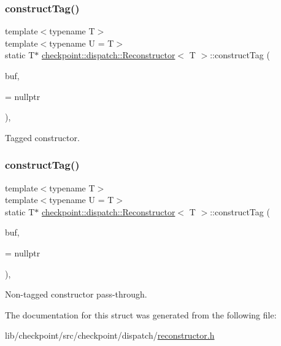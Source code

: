 \subsubsection{\texorpdfstring{construct\+Tag()}{constructTag()}\hspace{0.1cm}{\footnotesize\ttfamily [1/2]}}
{\footnotesize\ttfamily template$<$typename T$>$ \\
template$<$typename U  = T$>$ \\
static T$\ast$ \hyperlink{structcheckpoint_1_1dispatch_1_1_reconstructor}{checkpoint\+::dispatch\+::\+Reconstructor}$<$ T $>$\+::construct\+Tag (\begin{DoxyParamCaption}\item[{void $\ast$}]{buf,  }\item[{\hyperlink{structcheckpoint_1_1dispatch_1_1_reconstructor_a59b6cbc4d45b5b293cbd1cd622ba86f9}{is\+Tagged\+Constructible\+Type}$<$ U $>$ $\ast$}]{ = {\ttfamily nullptr} }\end{DoxyParamCaption})\hspace{0.3cm}{\ttfamily [inline]}, {\ttfamily [static]}}



Tagged constructor. 

\mbox{\label{structcheckpoint_1_1dispatch_1_1_reconstructor_a116025ae56a26ed4d6a51b999f57fd47}} 
\subsubsection{\texorpdfstring{construct\+Tag()}{constructTag()}\hspace{0.1cm}{\footnotesize\ttfamily [2/2]}}
{\footnotesize\ttfamily template$<$typename T$>$ \\
template$<$typename U  = T$>$ \\
static T$\ast$ \hyperlink{structcheckpoint_1_1dispatch_1_1_reconstructor}{checkpoint\+::dispatch\+::\+Reconstructor}$<$ T $>$\+::construct\+Tag (\begin{DoxyParamCaption}\item[{void $\ast$}]{buf,  }\item[{\hyperlink{structcheckpoint_1_1dispatch_1_1_reconstructor_ad77b3a3fcf6fe7ed97698d6ca42b16c7}{is\+Not\+Tagged\+Constructible\+Type}$<$ U $>$ $\ast$}]{ = {\ttfamily nullptr} }\end{DoxyParamCaption})\hspace{0.3cm}{\ttfamily [inline]}, {\ttfamily [static]}}



Non-\/tagged constructor pass-\/through. 



The documentation for this struct was generated from the following file\+:\begin{DoxyCompactItemize}
\item 
lib/checkpoint/src/checkpoint/dispatch/\hyperlink{reconstructor_8h}{reconstructor.\+h}\end{DoxyCompactItemize}
